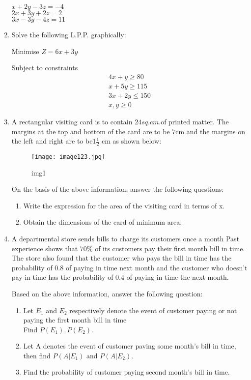 \documentclass{article}
\begin{document}
\begin{enumerate}
$x +2y-3z=-4$\\
$2x+3y+2z=2$\\
$3x-3y-4z=11$

\item Solve the following L.P.P. graphically:

Minimise $Z = 6x + 3y$

Subject to constraints
\begin{align*}
 4x+y\geq80\\
 x+5y\geq115\\
 3x+2y\leq150\\
x,y\geq0
\end{align*}
\item A rectangular visiting card is to contain $24 sq.cm. $of printed matter. The margins at the top and bottom of the card are to be $7\mathrm{cm}$ and the margins on the left and right are to be$1\frac{1}{2}$ cm as shown below:
\newpage
\begin{figure}[h!]
\centering
\texttt{[image: image123.jpg]}
\caption{img1}
\label{fig:image123}
\end{figure}

On the basis of the above information, answer the following questions:
\begin{enumerate}
\item Write the expression for the area of the visiting card in terms of x.
\item Obtain the dimensions of the card of minimum area.
\end{enumerate}
\item A departmental store sends bills to charge its customers once a month Past experience shows that $ 70\% $ of its customers pay their first month bill in time. The store also found that the customer who pays the bill in time has the probability of 0.8 of paying in time next month and the customer who doesn't pay in time has the probability of 0.4 of paying in time the next month.

Based on the above information, answer the following question:
\begin{enumerate}
\item Let  $E_1$ and $E_2$ respectively denote the event of customer paying or not paying the first month bill in time\\
Find $P(E_1),P(E_2).$
\item Let A denotes the event of customer paving some month's bill in time, then find $P(A|E_1)$ and $P(A|E_2).$
\item Find the probability of customer paying second month's bill in time.
\end{enumerate}


\end{enumerate}
\end{document}
